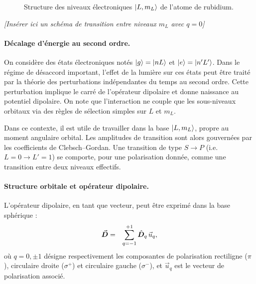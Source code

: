 \begin{figure}[!htb]
\begin{tikzpicture}
\end{tikzpicture}
\caption{Structure des niveaux électroniques $\ket{L, m_L}$ de l’atome de rubidium.}

\end{figure}

\vspace{1em}
\begin{center}
\textit{[Insérer ici un schéma de transition entre niveaux $m_L$ avec $q = 0$]}
\end{center}

\paragraph{Décalage d’énergie au second ordre.}
On considère des états électroniques notés $\ket{g} = \ket{nL}$ et $\ket{e} = \ket{n'L'}$. Dans le régime de désaccord important, l’effet de la lumière sur ces états peut être traité par la théorie des perturbations indépendantes du temps au second ordre. Cette perturbation implique le carré de l’opérateur dipolaire et donne naissance au potentiel dipolaire. On note que l’interaction ne couple que les sous-niveaux orbitaux via des règles de sélection simples sur $L$ et $m_L$.

Dans ce contexte, il est utile de travailler dans la base $\ket{L, m_L}$, propre au moment angulaire orbital. Les amplitudes de transition sont alors gouvernées par les coefficients de Clebsch–Gordan. Une transition de type $S \rightarrow P$ (i.e. $L = 0 \to L' = 1$) se comporte, pour une polarisation donnée, comme une transition entre deux niveaux effectifs.

\paragraph{Structure orbitale et opérateur dipolaire.}

L’opérateur dipolaire, en tant que vecteur, peut être exprimé dans la base sphérique :
\begin{eqnarray*}
\operatorvec{D} &=& \sum_{q = -1}^{+1} \operator{D}_q\, \vec{u}_q,
\end{eqnarray*}
où $q = 0, \pm 1$ désigne respectivement les composantes de polarisation rectiligne ($\pi$), circulaire droite ($\sigma^+$) et circulaire gauche ($\sigma^-$), et $\vec{u}_q$ est le vecteur de polarisation associé.

